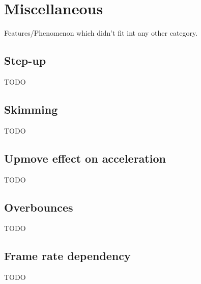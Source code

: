 \section{Miscellaneous}
\label{sec:misc}
Features/Phenomenon which didn't fit int any other category.

\subsection{Step-up}
\label{sec:stepup}
TODO

\subsection{Skimming}
\label{sec:skimming}
TODO

\subsection{Upmove effect on acceleration}
\label{sec:upmove}
TODO

\subsection{Overbounces}
\label{sec:overbounce}
TODO

\subsection{Frame rate dependency}
\label{sec:framerate}
TODO
